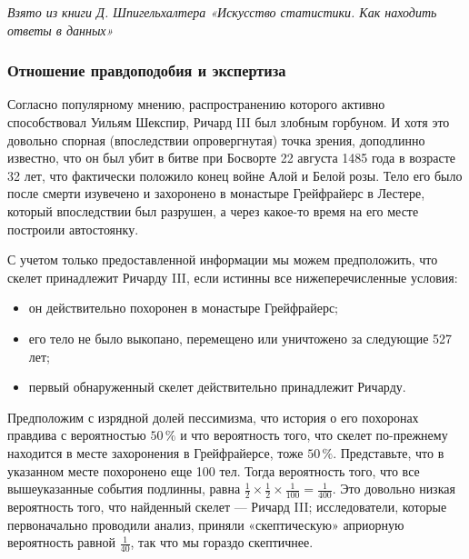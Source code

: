\documentclass[11pt,a4paper]{article}
\providecommand{\tightlist}{%
      \setlength{\itemsep}{0pt}\setlength{\parskip}{0pt}}
\begin{document}
\emph{Взято из книги Д. Шпигельхалтера «Искусство статистики. Как
находить ответы в данных»}

    \hypertarget{ux43eux442ux43dux43eux448ux435ux43dux438ux435-ux43fux440ux430ux432ux434ux43eux43fux43eux434ux43eux431ux438ux44f-ux438-ux44dux43aux441ux43fux435ux440ux442ux438ux437ux430}{%
\subsubsection{Отношение правдоподобия и
экспертиза}\label{ux43eux442ux43dux43eux448ux435ux43dux438ux435-ux43fux440ux430ux432ux434ux43eux43fux43eux434ux43eux431ux438ux44f-ux438-ux44dux43aux441ux43fux435ux440ux442ux438ux437ux430}}

    Согласно популярному мнению, распространению которого активно
способствовал Уильям Шекспир, Ричард III был злобным горбуном. И хотя
это довольно спорная (впоследствии опровергнутая) точка зрения,
доподлинно известно, что он был убит в битве при Босворте 22 августа
1485 года в возрасте 32 лет, что фактически положило конец войне Алой и
Белой розы. Тело его было после смерти изувечено и захоронено в
монастыре Грейфрайерс в Лестере, который впоследствии был разрушен, а
через какое-то время на его месте построили автостоянку.

С учетом только предоставленной информации мы можем предположить, что
скелет принадлежит Ричарду III, если истинны все нижеперечисленные
условия:

\begin{itemize}
\tightlist
\item
  он действительно похоронен в монастыре Грейфрайерс;
\item
  его тело не было выкопано, перемещено или уничтожено за следующие 527
  лет;
\item
  первый обнаруженный скелет действительно принадлежит Ричарду.
\end{itemize}

Предположим с изрядной долей пессимизма, что история о его похоронах
правдива с вероятностью \(50\,\%\) и что вероятность того, что скелет
по-прежнему находится в месте захоронения в Грейфрайерсе, тоже
\(50\,\%\). Представьте, что в указанном месте похоронено еще 100 тел.
Тогда вероятность того, что все вышеуказанные события подлинны, равна
\(\frac{1}{2} \times \frac{1}{2} \times \frac{1}{100} = \frac{1}{400}\).
Это довольно низкая вероятность того, что найденный скелет --- Ричард
III; исследователи, которые первоначально проводили анализ, приняли
«скептическую» априорную вероятность равной \(\frac{1}{40}\), так что мы
гораздо скептичнее.
\end{document}
